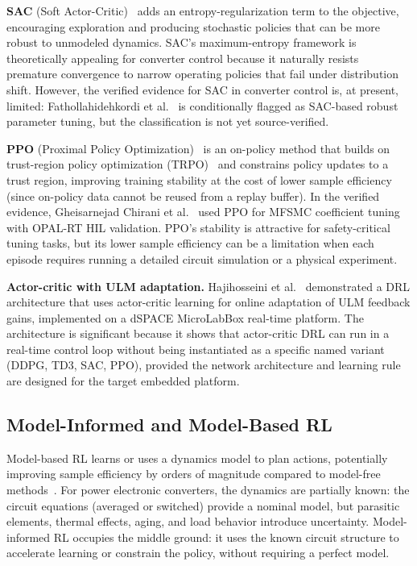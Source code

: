 \documentclass[manuscript,screen,review]{acmart}
\begin{document}
\textbf{SAC} (Soft Actor-Critic)~\cite{haarnoja2018soft} adds an entropy-regularization term to the objective, encouraging exploration and producing stochastic policies that can be more robust to unmodeled dynamics.
SAC's maximum-entropy framework is theoretically appealing for converter control because it naturally resists premature convergence to narrow operating policies that fail under distribution shift.
However, the verified evidence for SAC in converter control is, at present, limited: Fathollahidehkordi et al.~\cite{fathollahi2023robust} is conditionally flagged as SAC-based robust parameter tuning, but the classification is not yet source-verified.

\textbf{PPO} (Proximal Policy Optimization)~\cite{schulman2017proximal} is an on-policy method that builds on trust-region policy optimization (TRPO)~\cite{schulman2015trust} and constrains policy updates to a trust region, improving training stability at the cost of lower sample efficiency (since on-policy data cannot be reused from a replay buffer).
In the verified evidence, Gheisarnejad Chirani et al.~\cite{gheisarnejad2022reducing} used PPO for MFSMC coefficient tuning with OPAL-RT HIL validation.
PPO's stability is attractive for safety-critical tuning tasks, but its lower sample efficiency can be a limitation when each episode requires running a detailed circuit simulation or a physical experiment.

\textbf{Actor-critic with ULM adaptation.}
Hajihosseini et al.~\cite{hajihosseini2020dc} demonstrated a DRL architecture that uses actor-critic learning for online adaptation of ULM feedback gains, implemented on a dSPACE MicroLabBox real-time platform.
The architecture is significant because it shows that actor-critic DRL can run in a real-time control loop without being instantiated as a specific named variant (DDPG, TD3, SAC, PPO), provided the network architecture and learning rule are designed for the target embedded platform.

\subsection{Model-Informed and Model-Based RL}

Model-based RL learns or uses a dynamics model to plan actions, potentially improving sample efficiency by orders of magnitude compared to model-free methods~\cite{moerland2023model}.
For power electronic converters, the dynamics are partially known: the circuit equations (averaged or switched) provide a nominal model, but parasitic elements, thermal effects, aging, and load behavior introduce uncertainty.
Model-informed RL occupies the middle ground: it uses the known circuit structure to accelerate learning or constrain the policy, without requiring a perfect model.
\end{document}
